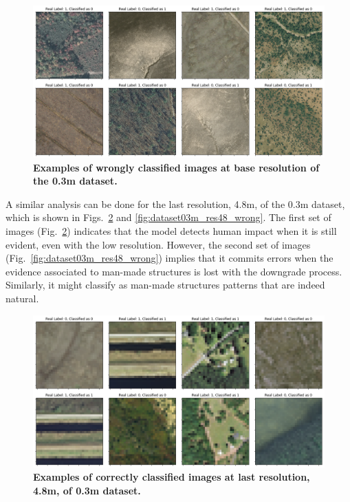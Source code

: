 \begin{figure}[H]
	\centering
	\captionsetup{width=1\linewidth}
	\includegraphics[width=1\textwidth]{Figures/results/class_dataset03m_res03_wrong.png}
	\caption{\textbf{Examples of wrongly classified images at base resolution of the 0.3m dataset.}}
	\label{fig:dataset03m_res03_wrong}
\end{figure}

A similar analysis can be done for the last resolution, 4.8m, of the 0.3m dataset, which is shown in Figs.~\ref{fig:dataset03m_res48_correct} and \ref{fig:dataset03m_res48_wrong}. The first set of images (Fig.~\ref{fig:dataset03m_res48_correct}) indicates that the model detects human impact when it is still evident, even with the low resolution. However, the second set of images (Fig.~\ref{fig:dataset03m_res48_wrong}) implies that it commits errors when the evidence associated to man-made structures is lost with the downgrade process. Similarly, it might classify as man-made structures patterns that are indeed natural.

\begin{figure}[H]
	\centering
	\captionsetup{width=1\linewidth}
	\includegraphics[width=1\textwidth]{Figures/results/class_dataset03m_res48_correct.png}
	\caption{\textbf{Examples of correctly classified images at last resolution, 4.8m, of 0.3m dataset.}}
	\label{fig:dataset03m_res48_correct}
\end{figure}

